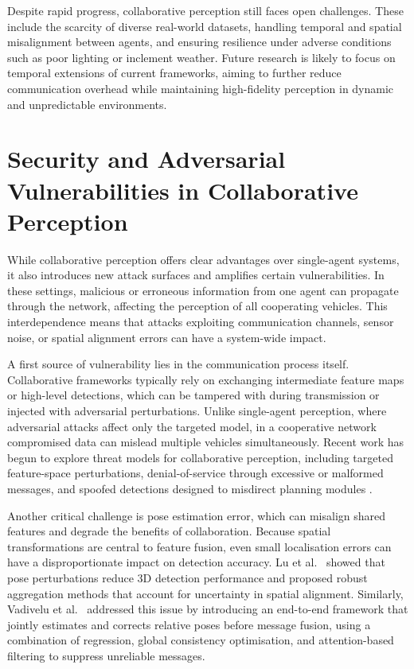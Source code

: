 Despite rapid progress, collaborative perception still faces open challenges.
These include the scarcity of diverse real-world datasets, handling temporal and spatial misalignment between agents, and ensuring resilience under adverse conditions such as poor lighting or inclement weather.
Future research is likely to focus on temporal extensions of current frameworks, aiming to further reduce communication overhead while maintaining high-fidelity perception in dynamic and unpredictable environments.

\section{Security and Adversarial Vulnerabilities in Collaborative Perception}

While collaborative perception offers clear advantages over single-agent systems, it also introduces new attack surfaces and amplifies certain vulnerabilities.
In these settings, malicious or erroneous information from one agent can propagate through the network, affecting the perception of all cooperating vehicles.
This interdependence means that attacks exploiting communication channels, sensor noise, or spatial alignment errors can have a system-wide impact.

A first source of vulnerability lies in the communication process itself.
Collaborative frameworks typically rely on exchanging intermediate feature maps or high-level detections, which can be tampered with during transmission or injected with adversarial perturbations.
Unlike single-agent perception, where adversarial attacks affect only the targeted model, in a cooperative network compromised data can mislead multiple vehicles simultaneously.
Recent work has begun to explore threat models for collaborative perception, including targeted feature-space perturbations, denial-of-service through excessive or malformed messages, and spoofed detections designed to misdirect planning modules \cite{wang2025rcdnrobustcamerainsensitivitycollaborative}.

Another critical challenge is pose estimation error, which can misalign shared features and degrade the benefits of collaboration.
Because spatial transformations are central to feature fusion, even small localisation errors can have a disproportionate impact on detection accuracy.
Lu et al.\ \cite{lu2023robustcollaborative3dobject} showed that pose perturbations reduce 3D detection performance and proposed robust aggregation methods that account for uncertainty in spatial alignment.
Similarly, Vadivelu et al.\ \cite{vadivelu2020learningcommunicatecorrectpose} addressed this issue by introducing an end-to-end framework that jointly estimates and corrects relative poses before message fusion, using a combination of regression, global consistency optimisation, and attention-based filtering to suppress unreliable messages.

